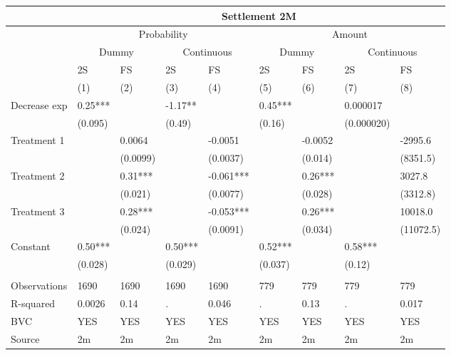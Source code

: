 \begin{tabular}{lllllllll}
      & \multicolumn{8}{c}{Settlement 2M} \\
\midrule
      & \multicolumn{4}{c}{Probability} & \multicolumn{4}{c}{Amount} \\
\midrule
\midrule
      & \multicolumn{2}{c}{Dummy} & \multicolumn{2}{c}{Continuous} & \multicolumn{2}{c}{Dummy} & \multicolumn{2}{c}{Continuous} \\
\midrule
      & 2S    & FS    & 2S    & FS    & 2S    & FS    & 2S    & FS \\
\midrule
\midrule
      & (1)   & (2)   & (3)   & (4)   & (5)   & (6)   & (7)   & (8) \\
\midrule
\midrule
Decrease exp & 0.25*** &       & -1.17** &       & 0.45*** &       & 0.000017 &  \\
      & (0.095) &       & (0.49) &       & (0.16) &       & (0.000020) &  \\
Treatment 1  &       & 0.0064 &       & -0.0051 &       & -0.0052 &       & -2995.6 \\
      &       & (0.0099) &       & (0.0037) &       & (0.014) &       & (8351.5) \\
Treatment 2 &       & 0.31*** &       & -0.061*** &       & 0.26*** &       & 3027.8 \\
      &       & (0.021) &       & (0.0077) &       & (0.028) &       & (3312.8) \\
Treatment 3 &       & 0.28*** &       & -0.053*** &       & 0.26*** &       & 10018.0 \\
      &       & (0.024) &       & (0.0091) &       & (0.034) &       & (11072.5) \\
Constant & 0.50*** &       & 0.50*** &       & 0.52*** &       & 0.58*** &  \\
      & (0.028) &       & (0.029) &       & (0.037) &       & (0.12) &  \\
      &       &       &       &       &       &       &       &  \\
\midrule
Observations & 1690  & 1690  & 1690  & 1690  & 779   & 779   & 779   & 779 \\
R-squared & 0.0026 & 0.14  & .     & 0.046 & .     & 0.13  & .     & 0.017 \\
BVC   & YES   & YES   & YES   & YES   & YES   & YES   & YES   & YES \\
Source & 2m    & 2m    & 2m    & 2m    & 2m    & 2m    & 2m    & 2m \\
\bottomrule
\bottomrule
\end{tabular}%
